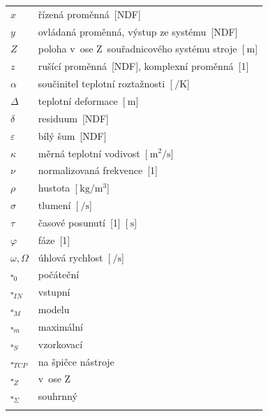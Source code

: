 \begin{xltabular}[l]{\linewidth}{@{} lX @{}}
$x$ & řízená proměnná~[NDF]\\
$y$ & ovládaná proměnná, výstup ze systému~[NDF]\\
$Z$ & poloha v~ose Z~souřadnicového systému stroje~[$\SI{}{\meter}$]\\
$z$ & rušící proměnná~[NDF], komplexní proměnná~[1]\\
$\alpha$ & součinitel teplotní roztažnosti~[$\SI{}{\per\kelvin}$]\\
$\Delta$ & teplotní deformace~[$\SI{}{\meter}$]\\
$\delta$ & residuum~[NDF]\\
$\varepsilon$ & bílý šum~[NDF]\\
$\kappa$ & měrná teplotní vodivost~[$\SI{}{\meter\squared\per\second}$]\\
$\nu$ & normalizovaná frekvence~[1]\\
$\rho$ & hustota~[$\SI{}{\kilogram\per\cubic\meter}$]\\
$\sigma$ & tlumení~[$\SI{}{\per\second}$]\\
$\tau$ & časové posunutí~[1]~[$\SI{}{\second}$]\\
$\varphi$ & fáze~[1]\\
$\omega , \Omega$ & úhlová rychlost~[$\SI{}{\per\second}$]\\
$\square_0$ & počáteční\\
$\square_{IN}$ & vstupní\\
$\square_M$ & modelu\\
$\square_m$ & maximální\\
$\square_S$ & vzorkovací\\
$\square_{TCP}$ & na špičce nástroje\\
$\square_Z$ & v~ose Z\\
$\square_\Sigma$ & souhrnný\\
\label{tab:sp}
\end{xltabular}

